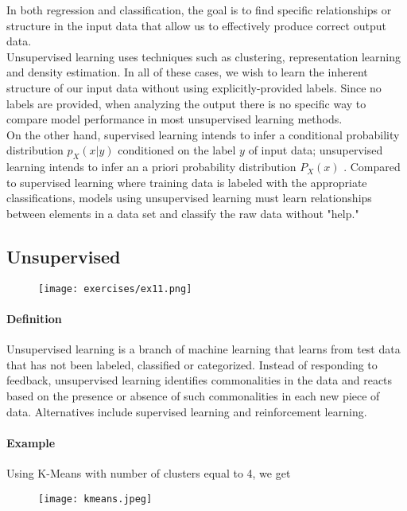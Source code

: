 In both regression and classification, the goal is to find specific relationships or structure in the input data that allow us to effectively produce correct output data.\\

Unsupervised learning uses techniques such as clustering, representation learning and density estimation. In all of these cases, we wish to learn the inherent structure of our input data without using explicitly-provided labels. Since no labels are provided, when analyzing the output there is no specific way to compare model performance in most unsupervised learning methods.\\
 
On the other hand, supervised learning  intends to infer a conditional probability distribution $p_X(x|y)$ conditioned on the label $y$ of input data; unsupervised learning intends to infer an a priori probability distribution $P_X(x)$ . Compared to supervised learning where training data is labeled with the appropriate classifications, models using unsupervised learning must learn relationships between elements in a data set and classify the raw data without "help."

\subsection{Unsupervised}
\begin{figure}[H]
    \centering
    \texttt{[image: exercises/ex11.png]}
\end{figure}

\paragraph{Definition}
Unsupervised learning is a branch of machine learning that learns from test data that has not been labeled, classified or categorized. Instead of responding to feedback, unsupervised learning identifies commonalities in the data and reacts based on the presence or absence of such commonalities in each new piece of data. Alternatives include supervised learning and reinforcement learning. 

\paragraph{Example}
Using K-Means with number of clusters equal to 4, we get 

\begin{figure}[H]
    \centering
    \texttt{[image: kmeans.jpeg]}
\end{figure}


